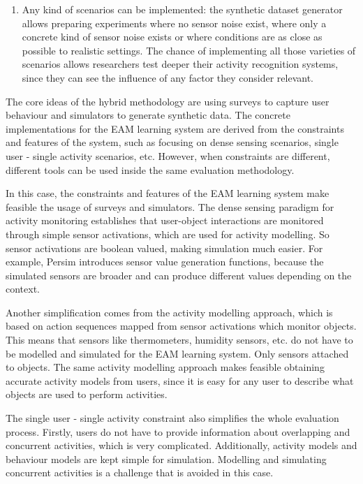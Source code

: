 \begin{enumerate}
 \item Any kind of scenarios can be implemented: the synthetic dataset generator allows preparing experiments where no sensor noise exist, where only a concrete kind of sensor noise exists or where conditions are as close as possible to realistic settings. The chance of implementing all those varieties of scenarios allows researchers test deeper their activity recognition systems, since they can see the influence of any factor they consider relevant. 
\end{enumerate}

The core ideas of the hybrid methodology are using surveys to capture user behaviour and simulators to generate synthetic data. The concrete implementations for the EAM learning system are derived from the constraints and features of the system, such as focusing on dense sensing scenarios, single user - single activity scenarios, etc. However, when constraints are different, different tools can be used inside the same evaluation methodology. 

In this case, the constraints and features of the EAM learning system make feasible the usage of surveys and simulators. The dense sensing paradigm for activity monitoring establishes that user-object interactions are monitored through simple sensor activations, which are used for activity modelling. So sensor activations are boolean valued, making simulation much easier. For example, Persim introduces sensor value generation functions, because the simulated sensors are broader and can produce different values depending on the context. 

Another simplification comes from the activity modelling approach, which is based on action sequences mapped from sensor activations which monitor objects. This means that sensors like thermometers, humidity sensors, etc. do not have to be modelled and simulated for the EAM learning system. Only sensors attached to objects. The same activity modelling approach makes feasible obtaining accurate activity models from users, since it is easy for any user to describe what objects are used to perform activities. 

The single user - single activity constraint also simplifies the whole evaluation process. Firstly, users do not have to provide information about overlapping and concurrent activities, which is very complicated. Additionally, activity models and behaviour models are kept simple for simulation. Modelling and simulating concurrent activities is a challenge that is avoided in this case. 

